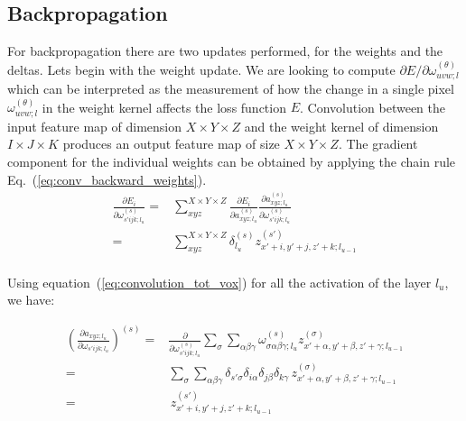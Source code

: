 \documentclass[final, paper=letter,5p,times,twocolumn]{elsarticle}
\begin{document}
\subsection{Backpropagation}

For backpropagation there are two updates performed, for the weights and the deltas. Lets begin with the weight update. We are looking to compute $\partial E / \partial \omega_{uvw;l}^{(\theta)}$ which can be interpreted as the measurement of how the change in a single pixel $\omega_{uvw;l}^{(\theta)}$ in the weight kernel affects the loss function $E$. Convolution between the input feature map of dimension $X \times Y \times Z$  and the weight kernel of dimension $I \times J \times K$ produces an output feature map of size $X \times Y \times Z$. The gradient component for the individual weights can be obtained by applying the chain rule Eq.~(\ref{eq:conv_backward_weights}).\\


\begin{equation}
  \begin{split}
    \frac{\partial E_{i}}{\partial \omega_{s'ijk;l_{u}}^{(s)}} =& \sum_{xyz}^{X \times Y \times Z} \frac{\partial E_{i}}{\partial a_{xyz;l_{u}}^{(s)}}\frac{\partial a_{xyz;l_{u}}^{(s)}}{\partial \omega_{s'ijk;l_{u}}^{(s)}}  \\
    =& \sum_{xyz}^{X \times Y \times Z} \delta_{l_{u}}^{(s)}z_{x'+i,y'+j,z'+k;l_{u-1}}^{(s')} \\
  \end{split}
  \label{eq:conv_backward_weights} 
\end{equation}

Using equation~(\ref{eq:convolution_tot_vox}) for all the activation of the layer $l_{u}$, we have:

\begin{equation*}
  \begin{split}
    \left( \frac{\partial a_{xyz;l_{u}}}{\partial \omega_{s'ijk;l_{u}}} \right)^{(s)} =& \frac{\partial }{\partial \omega_{s'ijk;l_{u}}^{(s)}}\sum_{\sigma}\sum_{\alpha \beta \gamma} \omega_{\sigma \alpha \beta \gamma;l_{u}}^{(s)}z_{x'+\alpha,y'+\beta,z'+\gamma;l_{u-1}}^{(\sigma)}\\
    =& \sum_{\sigma}\sum_{\alpha \beta \gamma} \delta_{s' \sigma} \delta_{i \alpha} \delta_{j \beta} \delta_{k \gamma} \, z_{x'+\alpha,y'+\beta,z'+\gamma;l_{u-1}}^{(\sigma)}\\
    =& \, z_{x'+i,y'+j,z'+k;l_{u-1}}^{(s')}
  \end{split}
\end{equation*}
\end{document}
